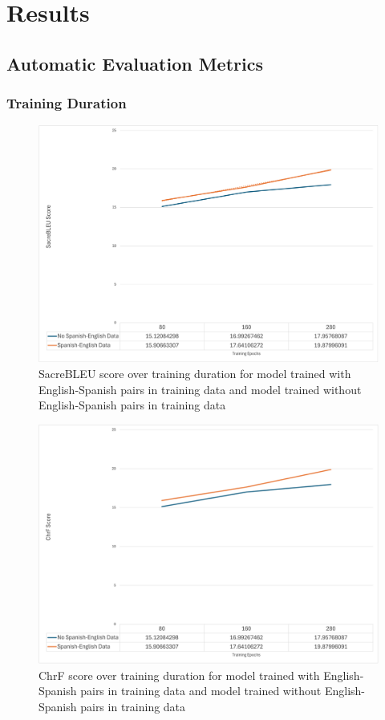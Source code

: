 \documentclass[10pt,twocolumn]{article}
\begin{document}
\section{Results}

\subsection{Automatic Evaluation Metrics}


\subsubsection{Training Duration}

\begin{figure}
    \centering
    \includegraphics[width=.95\linewidth]{TrainingDurationSacreBLEU.png}
    \caption{
       SacreBLEU score over training duration for model trained with English-Spanish pairs in training data and model trained without English-Spanish pairs in training data
    }
    \label{fig:first-page}
\end{figure}


\begin{figure}
    \centering
    \includegraphics[width=.95\linewidth]{TrainingDurationChrF.png}
    \caption{
        ChrF score over training duration for model trained with English-Spanish pairs in training data and model trained without English-Spanish pairs in training data
    }
    \label{fig:first-page}
\end{figure}
\end{document}

